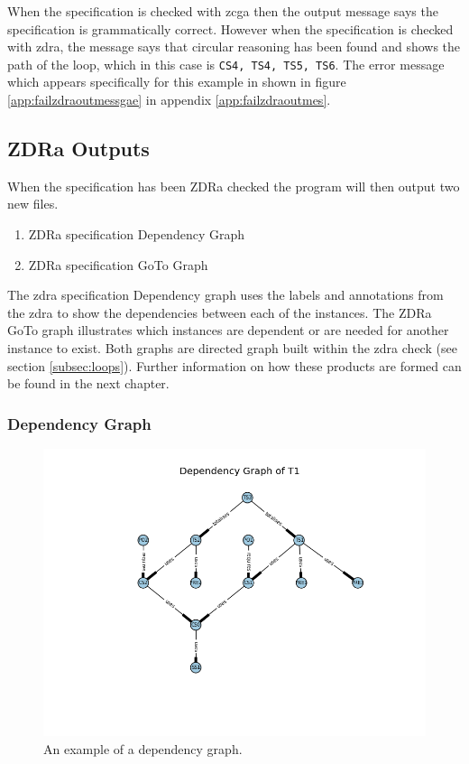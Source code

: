 When the specification is checked with \gls{zcga} then the output message says
the specification is grammatically correct. However when the specification is
checked with \gls{zdra}, the message says that circular reasoning has been found
and shows the path of the loop, which in this case is \verb|CS4, TS4, TS5, TS6|.
The error message which appears specifically for this example in shown in figure
\ref{app:failzdraoutmessgae} in appendix \ref{app:failzdraoutmes}.

\subsection{ZDRa Outputs}
\label{subsec:zdra_prodcuts}

When the specification has been ZDRa checked the program will then output two
new files. 

\begin{enumerate}

\item ZDRa specification Dependency Graph

\item ZDRa specification GoTo Graph
\end{enumerate}

The \gls{zdra} specification Dependency graph uses the labels and annotations
from the \gls{zdra} to show the dependencies between each of the instances. The
ZDRa GoTo graph illustrates which instances are dependent or are needed for
another instance to exist. Both graphs are directed graph built
within the \gls{zdra} check (see section \ref{subsec:loops}). Further information on
how these products are formed can be found in the next chapter.

\subsubsection{Dependency Graph}

\begin{figure}[H]
\centering
\includegraphics[scale=0.6]{Figures/zdra/depgraph.png}
\caption{An example of a dependency graph. \label{fig:depgraph}}
\end{figure}

